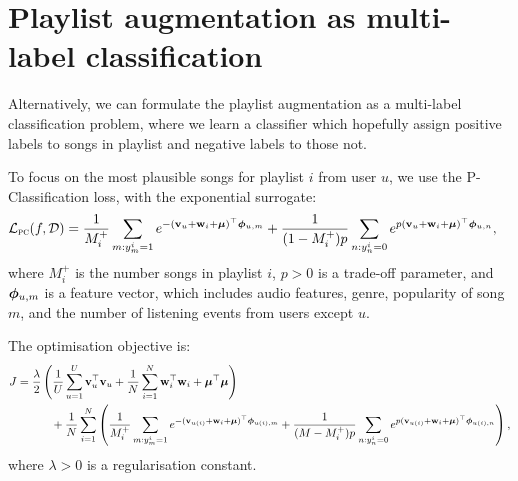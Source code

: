 \section{Playlist augmentation as multi-label classification}

Alternatively, we can formulate the playlist augmentation as a multi-label classification problem,
where we learn a classifier which hopefully assign positive labels to songs in playlist and negative labels to those not.

To focus on the most plausible songs for playlist $i$ from user $u$,
we use the P-Classification loss, with the exponential surrogate:
\begin{equation*}
\begin{aligned}
\mathcal{L}_\textsc{pc}(f, \mathcal{D}) 
&= \frac{1}{M_i^+} \sum_{m: y_m^i = 1} e^{-(\mathbf{v}_u + \mathbf{w}_i + \bm{\mu})^\top \bm{\phi}_{u,m}} 
   + \frac{1}{(1 - M_i^+) p} \sum_{n: y_n^i = 0} e^{p (\mathbf{v}_u + \mathbf{w}_i + \bm{\mu})^\top \bm{\phi}_{u,n}},
\end{aligned}
\end{equation*}
where $M_i^+$ is the number songs in playlist $i$,
$p > 0$ is a trade-off parameter,
and $\bm{\phi}_{u,m}$ is a feature vector,
which includes audio features, genre, popularity of song $m$,
and the number of listening events from users except $u$.

The optimisation objective is:
\begin{equation*}
\begin{aligned}
J &= \frac{\lambda}{2} \left( \frac{1}{U} \sum_{u=1}^U \mathbf{v}_u^\top \mathbf{v}_u 
     + \frac{1}{N} \sum_{i=1}^N \mathbf{w}_i^\top \mathbf{w}_i + \bm{\mu}^\top \bm{\mu} \right) \\
& \hspace{3em}
     + \frac{1}{N} \sum_{i=1}^N \left( \frac{1}{M_i^+} \sum_{m: y_m^i = 1} e^{-(\mathbf{v}_{u(i)} + \mathbf{w}_i + \bm{\mu})^\top \bm{\phi}_{u(i),m}} 
     + \frac{1}{(M - M_i^+) p} \sum_{n: y_n^i = 0} e^{p (\mathbf{v}_{u(i)} + \mathbf{w}_i + \bm{\mu})^\top \bm{\phi}_{u(i),n}} \right),
\end{aligned}
\end{equation*}
where $\lambda > 0$ is a regularisation constant.
